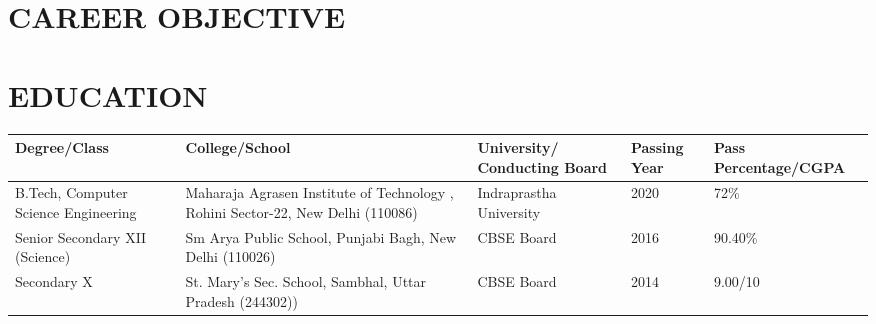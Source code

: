 \documentclass[11pt,a4paper,sans]{moderncv}
\begin{document}
\maketitle

\section{CAREER OBJECTIVE}

\section{EDUCATION}

\begin{center}
	\begin{tabular}{ | m{3.2cm} | m{7.1cm}| m{2.2cm} | m{1.4cm} | m{1.8cm}| } 

	\hline
	Degree/Class & College/School & University/ Conducting Board & Passing Year & Pass Percentage/CGPA \\

	\hline
	B.Tech, Computer Science Engineering & Maharaja Agrasen Institute of Technology     , Rohini Sector-22, New Delhi (110086) & Indraprastha University & 2020 & 72\% \\

	\hline
	Senior Secondary XII (Science) & Sm Arya Public School, Punjabi Bagh, New Delhi (110026) & CBSE Board & 2016 & 90.40\% \\

	\hline
	Secondary X & St. Mary's Sec. School, Sambhal, Uttar Pradesh (244302)) & CBSE Board & 2014 & 9.00/10 \\

	\hline
	\end{tabular}
\end{center}
\end{document}
